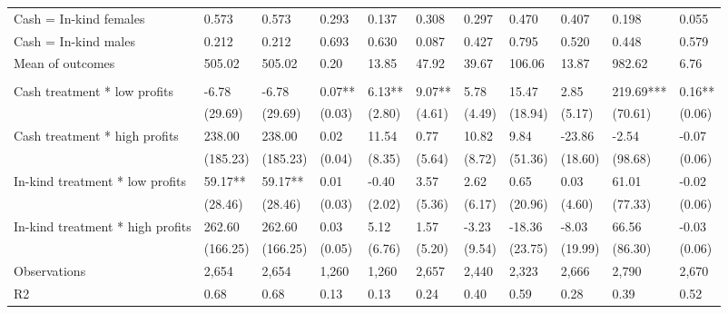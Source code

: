 \documentclass{report}
\begin{document}
\begin{table}[H]
{\begin{tabular}{lllllllllll}
\hspace{1em}\hspace{1em} Cash = In-kind females & 0.573 & 0.573 & 0.293 & 0.137 & 0.308 & 0.297 & 0.470 & 0.407 & 0.198 & 0.055\\
\hspace{1em}\hspace{1em} Cash = In-kind males & 0.212 & 0.212 & 0.693 & 0.630 & 0.087 & 0.427 & 0.795 & 0.520 & 0.448 & 0.579\\
\hspace{1em}Mean of outcomes & 505.02 & 505.02 & 0.20 & 13.85 & 47.92 & 39.67 & 106.06 & 13.87 & 982.62 & 6.76\\
\addlinespace[0.3em]
\multicolumn{11}{l}{\textbf{Panel B: Female sub-sample}}\\
\hspace{1em}Cash treatment * low profits & -6.78 & -6.78 & 0.07** & 6.13** & 9.07** & 5.78 & 15.47 & 2.85 & 219.69*** & 0.16**\\
\hspace{1em} & (29.69) & (29.69) & (0.03) & (2.80) & (4.61) & (4.49) & (18.94) & (5.17) & (70.61) & (0.06)\\
\hspace{1em}Cash treatment * high profits & 238.00 & 238.00 & 0.02 & 11.54 & 0.77 & 10.82 & 9.84 & -23.86 & -2.54 & -0.07\\
\hspace{1em} & (185.23) & (185.23) & (0.04) & (8.35) & (5.64) & (8.72) & (51.36) & (18.60) & (98.68) & (0.06)\\
\hspace{1em}In-kind treatment * low profits & 59.17** & 59.17** & 0.01 & -0.40 & 3.57 & 2.62 & 0.65 & 0.03 & 61.01 & -0.02\\
\hspace{1em} & (28.46) & (28.46) & (0.03) & (2.02) & (5.36) & (6.17) & (20.96) & (4.60) & (77.33) & (0.06)\\
\hspace{1em}In-kind treatment * high profits & 262.60 & 262.60 & 0.03 & 5.12 & 1.57 & -3.23 & -18.36 & -8.03 & 66.56 & -0.03\\
\hspace{1em} & (166.25) & (166.25) & (0.05) & (6.76) & (5.20) & (9.54) & (23.75) & (19.99) & (86.30) & (0.06)\\
\hspace{1em}Observations & 2,654 & 2,654 & 1,260 & 1,260 & 2,657 & 2,440 & 2,323 & 2,666 & 2,790 & 2,670\\
\hspace{1em}R2 & 0.68 & 0.68 & 0.13 & 0.13 & 0.24 & 0.40 & 0.59 & 0.28 & 0.39 & 0.52\\

\end{tabular}}
\end{table}
\end{document}
